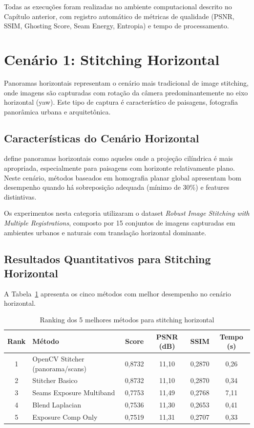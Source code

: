 Todas as execuções foram realizadas no ambiente computacional descrito no Capítulo anterior, com registro automático de métricas de qualidade (PSNR, SSIM, Ghosting Score, Seam Energy, Entropia) e tempo de processamento.

\section{Cenário 1: Stitching Horizontal}
\label{sec:horizontal}

Panoramas horizontais representam o cenário mais tradicional de image stitching, onde imagens são capturadas com rotação da câmera predominantemente no eixo horizontal (yaw). Este tipo de captura é característico de paisagens, fotografia panorâmica urbana e arquitetônica.

\subsection{Características do Cenário Horizontal}

\cite{Szeliski2006} define panoramas horizontais como aqueles onde a projeção cilíndrica é mais apropriada, especialmente para paisagens com horizonte relativamente plano. Neste cenário, métodos baseados em homografia planar global apresentam bom desempenho quando há sobreposição adequada (mínimo de 30\%) e features distintivas.

Os experimentos nesta categoria utilizaram o dataset \textit{Robust Image Stitching with Multiple Registrations}, composto por 15 conjuntos de imagens capturadas em ambientes urbanos e naturais com translação horizontal dominante.

\subsection{Resultados Quantitativos para Stitching Horizontal}

A Tabela~\ref{tab:horizontal_top5} apresenta os cinco métodos com melhor desempenho no cenário horizontal.

\begin{table}[htb]
\centering
\caption{Ranking dos 5 melhores métodos para stitching horizontal}
\label{tab:horizontal_top5}
\small
\begin{tabular}{clcccc}
\hline
\textbf{Rank} & \textbf{Método} & \textbf{Score} & \textbf{PSNR (dB)} & \textbf{SSIM} & \textbf{Tempo (s)} \\ \hline
1 & OpenCV Stitcher (panorama/scans) & 0,8732 & 11,10 & 0,2870 & 0,26 \\
2 & Stitcher Basico & 0,8732 & 11,10 & 0,2870 & 0,34 \\
3 & Seams Exposure Multiband & 0,7753 & 11,49 & 0,2768 & 7,11 \\
4 & Blend Laplacian & 0,7536 & 11,30 & 0,2653 & 0,41 \\
5 & Exposure Comp Only & 0,7519 & 11,31 & 0,2707 & 0,33 \\
\hline
\end{tabular}
\end{table}

